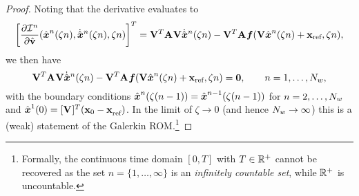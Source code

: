 \begin{proof}
Noting that the derivative evaluates to
\begin{equation*}
\bigg[ \frac{\partial \minintegrandArg{n}}{\partial \genstateyDiscreteDot}(\genstateArg{n}{\zeta n},\genstateDotArg{n}{\zeta n},\zeta n) \bigg]^T=
\basisspace^T \stweightingMatArgt{}{\zeta n} \basisspace \genstateDotArg{n}{\zeta n} -  \basisspace^T \stweightingMatArgt{}{\zeta n} \velocity(\basisspace \genstateArg{n}{\zeta n} + \stateIntercept ,\zeta n), 
\end{equation*}
we then have 
\begin{equation*}
\basisspace^T \stweightingMatArgt{}{\zeta n} \basisspace \genstateDotArg{n}{\zeta n} -  \basisspace^T \stweightingMatArgt{}{\zeta n} \velocity(\basisspace \genstateArg{n}{\zeta n} + \stateIntercept ,\zeta n) = \bz, \qquad n=1,\ldots,\nslabs, 
\end{equation*}
with the boundary conditions  $\genstateArg{n}{\zeta (n-1)} = \genstateArg{n-1}{\zeta(n-1)}$ for $n=2,\ldots,\nslabs$ and $\genstateArg{1}{0} = \genstateIC $. %
In the limit of $\zeta \rightarrow 0$ (and hence $\nslabs \rightarrow \infty$) this is a (weak) statement of the Galerkin ROM.\footnote{Formally, the continuous time domain $[0,T]$ with $T \in \RR{+}$ cannot be recovered as the set $n=\{1,\ldots,\infty\}$ is an \textit{infinitely countable set}, while $\RR{+}$ is uncountable.}
\end{proof}

